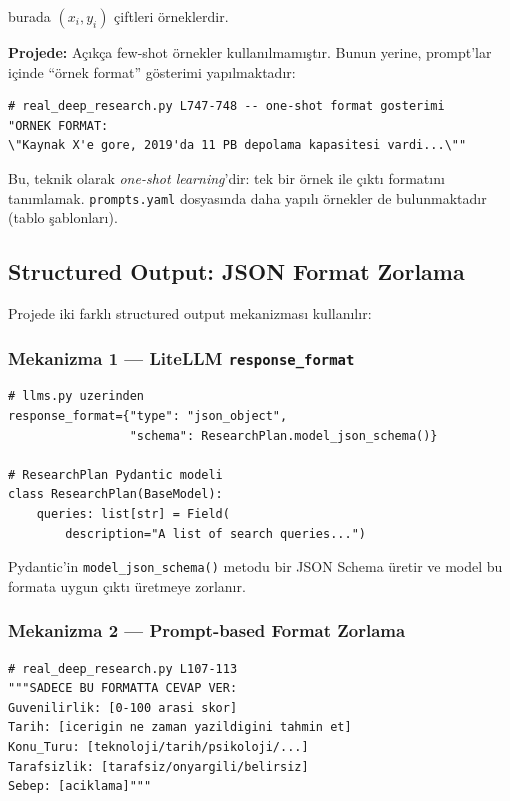 burada $(x_i, y_i)$ \c{c}iftleri \"{o}rneklerdir.

\textbf{Projede:} A\c{c}{\i}k\c{c}a few-shot \"{o}rnekler kullan{\i}lmam{\i}\c{s}t{\i}r. Bunun yerine, prompt'lar i\c{c}inde ``\"{o}rnek format'' g\"{o}sterimi yap{\i}lmaktad{\i}r:

\begin{lstlisting}
# real_deep_research.py L747-748 -- one-shot format gosterimi
"ORNEK FORMAT:
\"Kaynak X'e gore, 2019'da 11 PB depolama kapasitesi vardi...\""
\end{lstlisting}

Bu, teknik olarak \emph{one-shot learning}'dir: tek bir \"{o}rnek ile \c{c}{\i}kt{\i} format{\i}n{\i} tan{\i}mlamak. \texttt{prompts.yaml} dosyas{\i}nda daha yap{\i}l{\i} \"{o}rnekler de bulunmaktad{\i}r (tablo \c{s}ablonlar{\i}).


\subsection{Structured Output: JSON Format Zorlama}
\label{sec:structured-output}

Projede iki farkl{\i} structured output mekanizmas{\i} kullan{\i}l{\i}r:

\subsubsection{Mekanizma 1 --- LiteLLM \texttt{response\_format}}

\begin{lstlisting}
# llms.py uzerinden
response_format={"type": "json_object",
                 "schema": ResearchPlan.model_json_schema()}

# ResearchPlan Pydantic modeli
class ResearchPlan(BaseModel):
    queries: list[str] = Field(
        description="A list of search queries...")
\end{lstlisting}

Pydantic'in \texttt{model\_json\_schema()} metodu bir JSON Schema \"{u}retir ve model bu formata uygun \c{c}{\i}kt{\i} \"{u}retmeye zorlan{\i}r.

\subsubsection{Mekanizma 2 --- Prompt-based Format Zorlama}

\begin{lstlisting}
# real_deep_research.py L107-113
"""SADECE BU FORMATTA CEVAP VER:
Guvenilirlik: [0-100 arasi skor]
Tarih: [icerigin ne zaman yazildigini tahmin et]
Konu_Turu: [teknoloji/tarih/psikoloji/...]
Tarafsizlik: [tarafsiz/onyargili/belirsiz]
Sebep: [aciklama]"""
\end{lstlisting}

